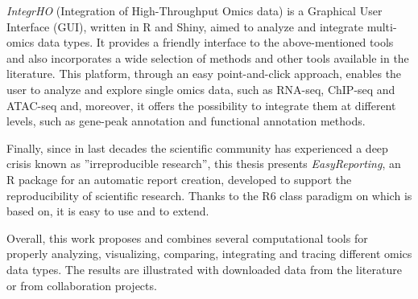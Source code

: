{\textit{IntegrHO} (Integration of High-Throughput Omics data) is a Graphical User Interface (GUI), written in R and Shiny, aimed to analyze and integrate multi-omics data types. It provides a friendly interface to the above-mentioned tools and also incorporates a wide selection of methods and other tools available in the literature. This platform, through an easy point-and-click approach, enables the user to analyze and explore single omics data, such as RNA-seq, ChIP-seq and ATAC-seq and, moreover, it offers the possibility to integrate them at different levels, such as gene-peak annotation and functional annotation methods.

Finally, since in last decades the scientific community has experienced a deep crisis known as ''irreproducible research'', this thesis presents \textit{EasyReporting}, an R package for an automatic report creation, developed to support the reproducibility of scientific research.  
Thanks to the R6 class paradigm on which is based on, it is easy to use and to extend.

Overall, this work proposes and combines several computational tools for properly analyzing, visualizing, comparing, integrating and tracing different omics data types. 
The results are illustrated with downloaded data from the literature or from collaboration projects.
}